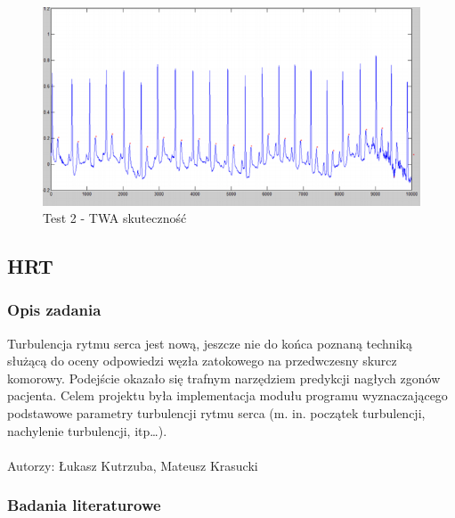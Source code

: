 \documentclass[a4paper, 11pt]{article}
\begin{document}
\begin{center}
%
\begin{figure}
\begin{centering}
\includegraphics[scale=0.4]{include/twa_3}
\par\end{centering}

\caption{Test 2 - TWA skuteczność}
\label{fig:twa_3}
\end{figure}

\par\end{center}

\subsection{HRT}
\label{sec:hrt}

\subsubsection{Opis zadania}
\label{sec:hrt:desc}

Turbulencja rytmu serca jest nową, jeszcze nie do końca poznaną techniką służącą do oceny odpowiedzi węzła zatokowego na przedwczesny skurcz komorowy. Podejście okazało się trafnym narzędziem predykcji nagłych zgonów pacjenta.
Celem projektu była implementacja modułu programu wyznaczającego podstawowe parametry turbulencji rytmu serca (m. in. początek turbulencji, nachylenie turbulencji, itp…).
\\
\\
Autorzy: Łukasz Kutrzuba, Mateusz Krasucki
\\
\subsubsection{Badania literaturowe}
\label{sec:hrt:papers}
\end{document}

